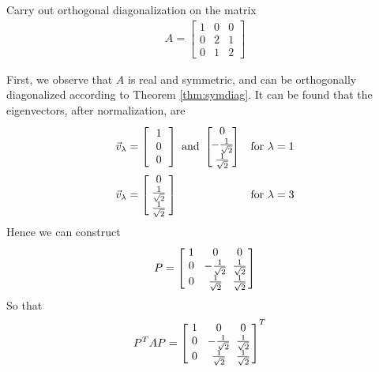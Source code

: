 \begin{exmp}
\label{exmp:orthodiag}
Carry out orthogonal diagonalization on the matrix
\begin{align*}
A =
\begin{bmatrix}
1 & 0 & 0 \\
0 & 2 & 1 \\
0 & 1 & 2
\end{bmatrix}
\end{align*}
\end{exmp}
\begin{solution}
First, we observe that $A$ is real and symmetric, and can be orthogonally diagonalized according to Theorem \ref{thm:symdiag}. It can be found that the eigenvectors, after normalization, are
\begin{align*}
&\vec{v}_\lambda = 
\left[
\begin{array}{wc{8pt}}
1 \\
0 \\
0
\end{array}\right] \text{ and }
\left[\begin{array}{wc{8pt}}
0 \\
-\frac{1}{\sqrt{2}} \\
\frac{1}{\sqrt{2}}
\end{array}\right]
& \text{for } \lambda = 1 \\
&\vec{v}_\lambda = 
\left[\begin{array}{wc{8pt}}
0 \\
\frac{1}{\sqrt{2}} \\
\frac{1}{\sqrt{2}}
\end{array}\right]
& \text{for } \lambda = 3
\end{align*}
Hence we can construct
\begin{align*}
P =
\left[\begin{array}{@{}wc{12pt}wc{12pt}wc{12pt}@{\,}}
1 & 0 & 0 \\
0 & -\frac{1}{\sqrt{2}} & \frac{1}{\sqrt{2}} \\
0 & \frac{1}{\sqrt{2}} & \frac{1}{\sqrt{2}}
\end{array}\right]
\end{align*}
So that
\begin{align*}
P^TAP &=
\left[\begin{array}{@{}wc{12pt}wc{12pt}wc{12pt}@{\,}}
1 & 0 & 0 \\
0 & -\frac{1}{\sqrt{2}} & \frac{1}{\sqrt{2}} \\
0 & \frac{1}{\sqrt{2}} & \frac{1}{\sqrt{2}}
\end{array}\right]^T

\end{align*}
\end{solution}
